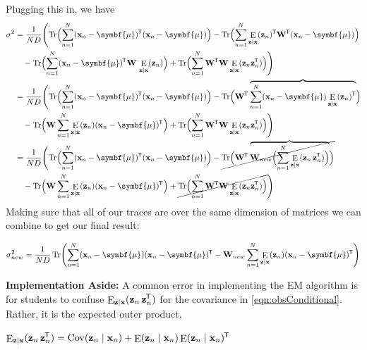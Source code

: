 \documentclass[11pt]{article}
\DeclareMathOperator{\E}{E}
\DeclareMathOperator{\Cov}{Cov}
\DeclareMathOperator{\Tr}{Tr}
\newcommand{\xb}{\mathbf{x}}
\newcommand{\zb}{\mathbf{z}}
\newcommand{\ub}{\symbf{\mu}}
\newcommand{\Wb}{\mathbf{W}}
\newcommand*{\tran}{^{\mkern-1.5mu\mathsf{T}}}
\newenvironment{propertybox}{%
   \def\FrameCommand{\colorbox{LightSteelBlue}}%
   \MakeFramed{\advance\hsize-\width \FrameRestore}}
 {\endMakeFramed}
\begin{document}
Plugging this in, we have
\begin{align*}
   \sigma^2 &= \frac{1}{N D} \Biggl(
    \Tr\Bigl(\sum_{n=1}^N (\xb_n - \ub)\tran(\xb_n - \ub)\Bigr)
    -\Tr\Bigl(\sum_{n=1}^N \E_{\zb\mid\xb}(\zb_n)\tran \Wb\tran (\xb_n - \ub)\Bigr) \\
    & \quad
    -\Tr\Bigl(\sum_{n=1}^N (\xb_n - \ub)\tran \Wb\, \E_{\zb\mid\xb}(\zb_n)\Bigr)
    +\Tr\Bigl(\sum_{n=1}^N \Wb\tran \Wb\E_{\zb\mid\xb}(\zb_n \zb_n\tran)\Bigr)
  \Biggr) \\
  &= \frac{1}{N D} \Biggl(
    \Tr\Bigl(\sum_{n=1}^N (\xb_n - \ub)\tran (\xb_n - \ub)\Bigr)
    -\Tr\Bigl(\Wb\tran \overbrace{\sum_{n=1}^N (\xb_n - \ub)\E_{\zb\mid\xb}(\zb_n)\tran}\Bigr) \\
    & \quad
    -\Tr\Bigl(\Wb \sum_{n=1}^N \E_{\zb\mid\xb}(\zb_n)(\xb_n - \ub)\tran\Bigr)
    +\Tr\Bigl(\sum_{n=1}^N \Wb\tran \Wb\E_{\zb\mid\xb}(\zb_n \zb_n\tran)\Bigr)
  \Biggr) \\
  &= \frac{1}{N D} \Biggl(
    \Tr\Bigl(\sum_{n=1}^N (\xb_n - \ub)\tran (\xb_n - \ub)\Bigr)
    -\cancel{\Tr\Bigl(\Wb\tran \overbrace{\Wb_{new} \Bigl(\sum_{n=1}^N \E_{\zb\mid\xb}(\zb_n\, \zb_n\tran) \Bigr)} \Bigr)} \\
    & \quad
    -\Tr\Bigl(\Wb\sum_{n=1}^N \E_{\zb\mid\xb}(\zb_n)(\xb_n - \ub)\tran\Bigr)
    +\cancel{\Tr\Bigl(\sum_{n=1}^N \Wb\tran \Wb\E_{\zb\mid\xb}(\zb_n \zb_n\tran)\Bigr)}
  \Biggr) \\
\end{align*}
Making sure that all of our traces are over the same dimension of matrices we
can combine to get our final result:
\begin{framed}
  \begin{equation}
    \sigma^2_{new} = \frac{1}{N D} \Tr \Biggl(
      \sum_{n=1}^N (\xb_n - \ub) (\xb_n - \ub) \tran
      - \Wb_{new}\sum_{n=1}^N \E_{\zb\mid\xb}(\zb_n)(\xb_n - \ub)\tran
    \Biggr)
  \end{equation}
\end{framed}

\begin{propertybox}
  \textbf{Implementation Aside:} A common error in implementing the EM algorithm
  is for students to confuse $\E_{\zb\mid\xb}(\zb_n\, \zb_n\tran)$ for the
  covariance in \eqref{eqn:obsConditional}. Rather, it is the expected outer
  product,

  $\E_{\zb\mid\xb}(\zb_n\, \zb_n\tran) = \Cov(\zb_n \mid \xb_n) +
  \E(\zb_n\mid\xb_n) \E(\zb_n\mid\xb_n)\tran$
\end{propertybox}
\end{document}
